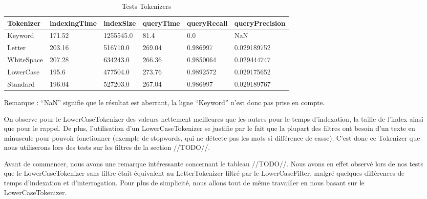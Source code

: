 \begin{table}[H]
                \centering
                \begin{tabular}{|p{2.3cm}|p{2.3cm}|p{2.3cm}|p{2.3cm}|p{2.3cm}|p{2.3cm}|}
                    \hline
                    \textbf{Tokenizer} & \textbf{indexingTime} & \textbf{indexSize} & \textbf{queryTime} & \textbf{queryRecall} & \textbf{queryPrecision}\\
                    \hline     
Keyword & 171.52 & 1255545.0 & 81.4 & 0.0 & NaN\\
		\hline
Letter & 203.16 & 516710.0 & 269.04 & 0.986997 & 0.029189752\\
		\hline
WhiteSpace & 207.28 & 634243.0 & 266.36 & 0.9850064 & 0.029444747\\
		\hline
LowerCase & 195.6 & 477504.0 & 273.76 & 0.9892572 & 0.029175652\\
		\hline
Standard & 196.04 & 527203.0 & 267.04 & 0.986997 & 0.029189767\\
                    \hline
                \end{tabular}
                \caption{Tests Tokenizers}
                \label{tab:tests_tokenizers}
            \end{table}

Remarque : “NaN” signifie que le résultat est aberrant, la ligne “Keyword” n’est donc pas prise en compte.

On observe pour le LowerCaseTokenizer des valeurs nettement meilleures que les autres pour le temps d’indexation, la taille de l’index ainsi que pour le rappel. De plus, l'utilisation d'un LowerCaseTokenizer se justifie par le fait que la plupart des filtres ont besoin d'un texte en minuscule pour pouvoir fonctionner (exemple de stopwords, qui ne détecte pas les mots si différence de casse). C’est donc ce Tokenizer que nous utiliserons lors des tests sur les filtres de la section //TODO//.

Avant de commencer, nous avons une remarque intéressante concernant le tableau //TODO//. Nous avons en effet observé lors de nos tests que le LowerCaseTokenizer sans filtre était équivalent au LetterTokenizer filtré par le LowerCaseFilter, malgré quelques différences de temps d’indexation et d’interrogation. Pour plus de simplicité, nous allons tout de même travailler en nous basant sur le LowerCaseTokenizer.

